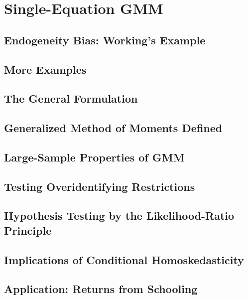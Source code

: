 
\chapter{Single-Equation GMM}
\label{ch:single-gmm}

\section{Endogeneity Bias: Working's Example}
\label{sec:3.1}


\section{More Examples}
\label{sec:3.2}


\section{The General Formulation}
\label{sec:3.3}


\section{Generalized Method of Moments Defined}
\label{sec:3.4}


\section{Large-Sample Properties of GMM}
\label{sec:3.5}


\section{Testing Overidentifying Restrictions}
\label{sec:3.6}


\section{Hypothesis Testing by the Likelihood-Ratio Principle}
\label{sec:3.7}


\section{Implications of Conditional Homoskedasticity}
\label{sec:3.8}


\section{Application: Returns from Schooling}
\label{sec:3.9}



